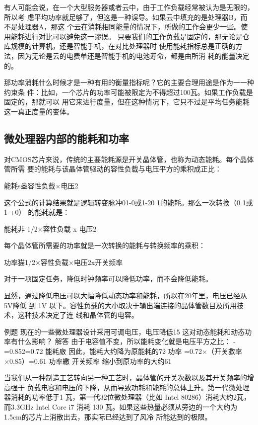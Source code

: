 有人可能会说，在一个大型服务器或者云中，由于工作负载经常被认为是无限的，所以考
虑平均功率就足够了，但这是一种误导。如果云中填充的是处理器B，而不是处理器A，那这
个云在消耗相同能量的情况下，所做的工作会更少一些。使用能耗进行对比可以避免这一谬误。
只要我们的工作负载是固定的，那无论是仓库规模的计算机，还是智能手机，在对比处理器时
使用能耗指标总是正确的方法，因为无论是云的电费单还是智能手机的电池寿命，都是由所消
耗的能量决定的。

那功率消耗什么时候才是一种有用的衡量指标呢？它的主要合理用途是作为一一种约束条
件：比如，一个芯片的功率可能被限定为不得超过100瓦。如果工作负载是固定的，那就可以
用它来进行度量，但在这种情况下，它只不过是平均任务能耗这一真正度量的变体。

\subsection{微处理器内部的能耗和功率}

对CMOS芯片来说，传统的主要能耗源是开关晶体管，也称为动态能耗。每个晶体管所需
要的能耗与该晶体管驱动的容性负载与电压平方的乘积成正比：

能耗s盎容性负载×电压2

这个公式的计算结果就是逻辑转变脉冲01-0或1-20 1的能耗。那么一次转換（0 1或1-+0）
的能耗就是：

能耗非 1/2×容性负载 x 电压2

每个晶体管所需要的功率就是一次转换的能耗与转换频率的乘积：

功率猫1/2×容性负载×电压2x开关频率

对于一项固定任务，降低时钟频率可以降低功率，而不会降低能耗。

显然，通过降低电压可以大幅降低动态功率和能耗，所以在20年里，电压已经从5V降低
到 1V 以下。容性负载的大小取决于输出端连接的品体管数目及所用技术，这种技术决定了连
线和晶体管的电容。

例题
现在的一些微处理器设计采用可调电压，电压降低15%
这对动态能耗和动态功率有什么影响？
解答
由于电容值不变，所以能耗变化就是电压平方之比：
-=0.852=0.72
能耗廒
因此，能耗大约降为原能耗的72%
功率 =0.72×（开关救率×0.85）=0.61
功率繳
开关频率
缩小到原功率的大约61%

当我们从一种制造工艺转向另一种工艺时，晶体管的开关次数以及其开关频率的增高强于
负载电容和电压的下降，从而导致功耗和能耗的总体上升。第一代微处理器消耗的功率低于1
瓦，第一代32位微处理器（比如 Intel 80286）消耗大约2瓦，而3.3GHz Intel Core i7 消耗 130
瓦。如果这些热量必须从旁边的一个大约为1.5cm的芯片上消散出去，那实际已经达到了风冷
所能达到的极限。

